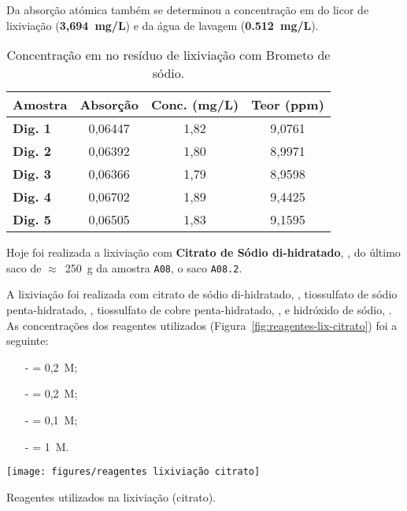 Da absorção atómica também se determinou a concentração em  do licor de lixiviação (\textbf{3,694~mg/L}) e da água de lavagem (\textbf{0.512~mg/L}).

\newpage

\begin{table}[!ht]
    \centering
    \begin{tabularx}{\textwidth}{@{}lCCC@{}}
        \toprule
        \textbf{Amostra} & \textbf{Absorção} & \textbf{Conc. (mg/L)} & \textbf{Teor  (ppm)} \\ \midrule
        \textbf{Dig. 1}  & 0,06447 & 1,82 & 9,0761 \\
        \textbf{Dig. 2}  & 0,06392 & 1,80 & 8,9971 \\
        \textbf{Dig. 3}  & 0,06366 & 1,79 & 8,9598\\
        \textbf{Dig. 4}  & 0,06702 & 1,89 & 9,4425 \\
        \textbf{Dig. 5}  & 0,06505 & 1,83 & 9,1595 \\
        \bottomrule
    \end{tabularx}
    \caption{Concentração em  no resíduo de lixiviação com Brometo de sódio.}
    \label{tab:aas-concentracao-au-res-bromo}
\end{table}

\hrulefill


\label{day:29-novembro-2024}

Hoje foi realizada a lixiviação com \textbf{Citrato de Sódio di-hidratado}, \citratodi{}, do último saco de $\approx$~250~g da amostra \texttt{A08}, o saco \texttt{A08.2}.

A lixiviação foi realizada com citrato de sódio di-hidratado, \citratodi{}, tiossulfato de sódio penta-hidratado, \tsp{}, tiossulfato de cobre penta-hidratado, \sulfcu{}, e hidróxido de sódio, \hidso{}.
As concentrações dos reagentes utilizados (Figura~\ref{fig:reagentes-lix-citrato}) foi a seguinte:
\begin{itemize}
    \item[-] \citratodi{} = 0,2~M;
    \item[-] \tsp{} = 0,2~M;
    \item[-] \sulfcu{} = 0,1~M;
    \item[-] \hidso{} = 1~M.
\end{itemize}

\begin{marginfigure}[-3cm]
    \centering
    \texttt{[image: figures/reagentes lixiviação citrato]}
    \caption{Reagentes utilizados na lixiviação (citrato).}
    \label{fig:reagentes-lix-citrato}
\end{marginfigure}

